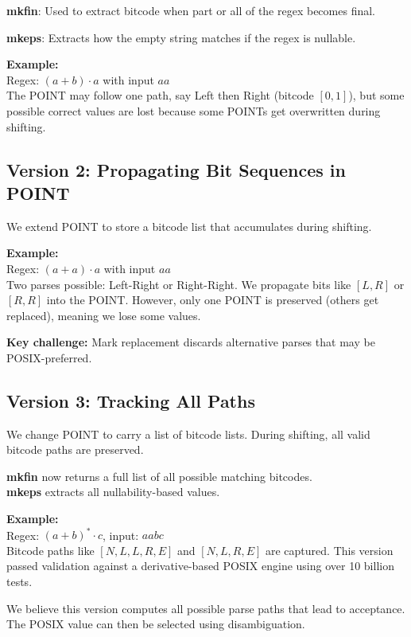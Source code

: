 \documentclass[11pt]{article}
\begin{document}
\textbf{mkfin}: Used to extract bitcode when part or all of the regex becomes final.

\textbf{mkeps}: Extracts how the empty string matches if the regex is nullable.

\textbf{Example:}\\
Regex: $(a + b) \cdot a$ with input $aa$\\
The POINT may follow one path, say Left then Right (bitcode $[0, 1]$), but some possible correct values are lost because some POINTs get overwritten during shifting.

\subsection*{Version 2: Propagating Bit Sequences in POINT}

We extend POINT to store a bitcode list that accumulates during shifting.

\textbf{Example:}\\
Regex: $(a + a) \cdot a$ with input $aa$\\
Two parses possible: Left-Right or Right-Right. We propagate bits like $[L, R]$ or $[R, R]$ into the POINT. However, only one POINT is preserved (others get replaced), meaning we lose some values.

\textbf{Key challenge:} Mark replacement discards alternative parses that may be POSIX-preferred.

\subsection*{Version 3: Tracking All Paths}

We change POINT to carry a list of bitcode lists. During shifting, all valid bitcode paths are preserved.

\textbf{mkfin} now returns a full list of all possible matching bitcodes.\\
\textbf{mkeps} extracts all nullability-based values.

\textbf{Example:}\\
Regex: $(a + b)^* \cdot c$, input: $aabc$\\
Bitcode paths like $[N, L, L, R, E]$ and $[N, L, R, E]$ are captured. This version passed validation against a derivative-based POSIX engine using over 10 billion tests.

We believe this version computes all possible parse paths that lead to acceptance. The POSIX value can then be selected using disambiguation.
\end{document}
